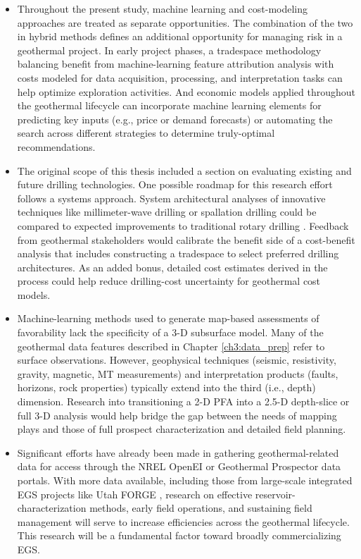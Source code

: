 \begin{itemize}
    \item Throughout the present study, machine learning and cost-modeling approaches are treated as separate opportunities. The combination of the two in hybrid methods defines an additional opportunity for managing risk in a geothermal project. In early project phases, a tradespace methodology balancing benefit from machine-learning feature attribution analysis with costs modeled for data acquisition, processing, and interpretation tasks can help optimize exploration activities. And economic models applied throughout the geothermal lifecycle can incorporate machine learning elements for predicting key inputs (e.g., price or demand forecasts) or automating the search across different strategies to determine truly-optimal recommendations.
    
    \item The original scope of this thesis included a section on evaluating existing and future drilling technologies. One possible roadmap for this research effort follows a systems approach. System architectural analyses of innovative techniques like millimeter-wave drilling \citep{woskov_millimeter-wave_2017} or spallation drilling \citep{augustine_hydrothermal_2009} could be compared to expected improvements to traditional rotary drilling \citep{lowry_geovision_2017}. Feedback from geothermal stakeholders would calibrate the benefit side of a cost-benefit analysis that includes constructing a tradespace to select preferred drilling architectures. As an added bonus, detailed cost estimates derived in the process could help reduce drilling-cost uncertainty for geothermal cost models.
    
    \item Machine-learning methods used to generate map-based assessments of favorability lack the specificity of a 3-D subsurface model. Many of the geothermal data features described in Chapter \ref{ch3:data_prep} refer to surface observations. However, geophysical techniques (seismic, resistivity, gravity, magnetic, MT measurements) and interpretation products (faults, horizons, rock properties) typically extend into the third (i.e., depth) dimension. Research into transitioning a 2-D PFA into a 2.5-D depth-slice or full 3-D analysis would help bridge the gap between the needs of mapping plays and those of full prospect characterization and detailed field planning.
    
    \item Significant efforts have already been made in gathering geothermal-related data for access through the NREL OpenEI \citep{hallett_open_2010} or Geothermal Prospector \citep{nrel_geothermal_2021} data portals. With more data available, including those from large-scale integrated EGS projects like Utah FORGE \citep{moore_utah_2019}, research on effective reservoir-characterization methods, early field operations, and sustaining field management will serve to increase efficiencies across the geothermal lifecycle. This research will be a fundamental factor toward broadly commercializing EGS.
\end{itemize}